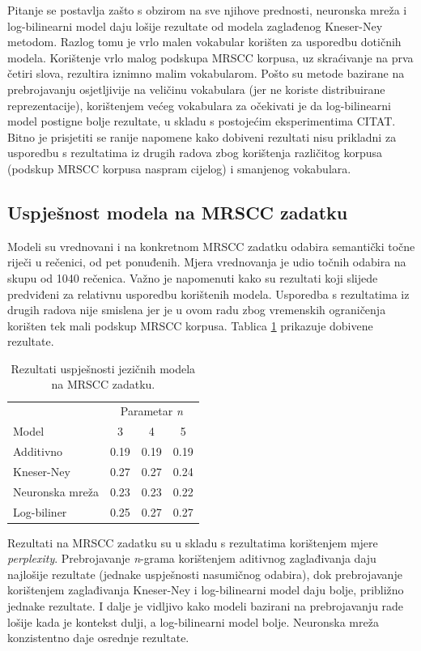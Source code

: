 \documentclass[times, utf8, diplomski, numeric]{fer}
\begin{document}
Pitanje se postavlja zašto s obzirom na sve njihove prednosti, neuronska mreža i log-bilinearni model daju lošije rezultate od modela zaglađenog Kneser-Ney metodom. Razlog tomu je vrlo malen vokabular korišten za usporedbu dotičnih modela. Korištenje vrlo malog podskupa MRSCC korpusa, uz skraćivanje na prva četiri slova, rezultira iznimno malim vokabularom. Pošto su metode bazirane na prebrojavanju osjetljivije na veličinu vokabulara (jer ne koriste distribuirane reprezentacije), korištenjem većeg vokabulara za očekivati je da log-bilinearni model postigne bolje rezultate, u skladu s postojećim eksperimentima CITAT. Bitno je prisjetiti se ranije napomene kako dobiveni rezultati nisu prikladni za usporedbu s rezultatima iz drugih radova zbog korištenja različitog korpusa (podskup MRSCC korpusa naspram cijelog) i smanjenog vokabulara.

\subsection{Uspješnost modela na MRSCC zadatku}

Modeli su vrednovani i na konkretnom MRSCC zadatku odabira semantički točne riječi u rečenici, od pet ponuđenih. Mjera vrednovanja je udio točnih odabira na skupu od 1040 rečenica. Važno je napomenuti kako su rezultati koji slijede predviđeni za relativnu usporedbu korištenih modela. Usporedba s rezultatima iz drugih radova nije smislena jer je u ovom radu zbog vremenskih ograničenja korišten tek mali podskup MRSCC korpusa. Tablica \ref{tbl:eval_mrscc} prikazuje dobivene rezultate.

\begin{table}[htb]
\caption{Rezultati uspješnosti jezičnih modela na MRSCC zadatku.}
\label{tbl:eval_mrscc}
\centering
\begin{tabular}{lccc}
\toprule
 & \multicolumn{3}{c}{Parametar \textit{n}} \\
\cmidrule(r){2-4}
Model & 3 & 4 & 5 \\
\midrule
Additivno &  0.19 & 0.19 & 0.19 \\
Kneser-Ney & 0.27 & 0.27 & 0.24 \\
Neuronska mreža & 0.23 & 0.23 & 0.22 \\
Log-biliner & 0.25 & 0.27 & 0.27 \\
\bottomrule
\end{tabular}
\end{table}

Rezultati na MRSCC zadatku su u skladu s rezultatima korištenjem mjere \textit{perplexity}. Prebrojavanje \textit{n}-grama korištenjem aditivnog zaglađivanja daju najlošije rezultate (jednake uspješnosti nasumičnog odabira), dok prebrojavanje korištenjem zaglađivanja Kneser-Ney i log-bilinearni model daju bolje, približno jednake rezultate. I dalje je vidljivo kako modeli bazirani na prebrojavanju rade lošije kada je kontekst dulji, a log-bilinearni model bolje. Neuronska mreža konzistentno daje osrednje rezultate.
\end{document}
